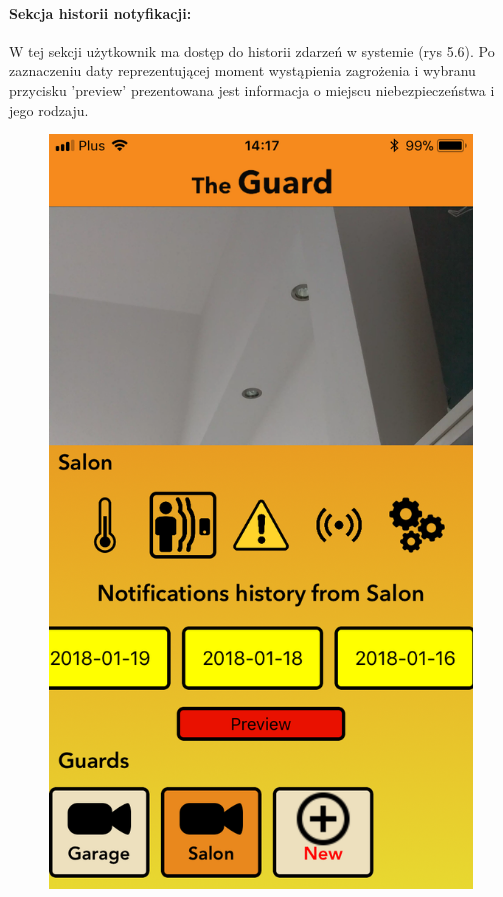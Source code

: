 \paragraph{Sekcja historii notyfikacji:}
W tej sekcji użytkownik ma dostęp do historii zdarzeń w systemie (rys 5.6). Po zaznaczeniu daty reprezentującej moment wystąpienia zagrożenia i wybranu przycisku 'preview' prezentowana jest informacja o miejscu niebezpieczeństwa i jego rodzaju. 
\begin{figure}[ht]
\centering
\begin{minipage}{.4\linewidth}
    \includegraphics[width=\linewidth]{history.png}

\end{minipage}
\end{figure}
